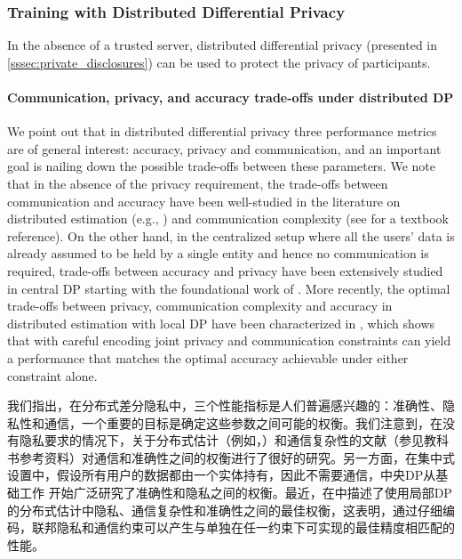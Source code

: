 \subsubsection{Training with Distributed Differential Privacy}
\label{sssec:distributed_dp}
In the absence of a trusted server, distributed differential privacy (presented in \cref{sssec:private_disclosures}) can be used to protect the privacy of participants. 

\paragraph{Communication, privacy, and accuracy trade-offs under distributed DP} 
We point out that in distributed differential privacy three performance metrics are of general interest: accuracy, privacy and communication, and an important goal is nailing down the possible trade-offs between these parameters. We note that in the absence of the privacy requirement, the trade-offs between communication and accuracy have been well-studied in the literature on distributed estimation (e.g., \cite{suresh2017distributed}) and communication complexity (see \cite{Kushilevitz_Nisan_cc} for a textbook reference). On the other hand, in the centralized setup where all the users' data is already assumed to be held by a single entity and hence no communication is required, trade-offs between accuracy and privacy have been extensively studied in central DP starting with the foundational work of \cite{DMNS06,dwork2006our}. More recently, the optimal trade-offs between privacy, communication complexity and accuracy in distributed estimation with local DP have been characterized in \cite{ChenKO2020}, which shows that with careful encoding joint privacy and communication constraints can yield a performance that matches the optimal accuracy achievable under either constraint alone.

我们指出，在分布式差分隐私中，三个性能指标是人们普遍感兴趣的：准确性、隐私性和通信，一个重要的目标是确定这些参数之间可能的权衡。我们注意到，在没有隐私要求的情况下，关于分布式估计（例如，\cite{suresh2017distributed}）和通信复杂性的文献（参见教科书参考资料\cite{Kushilevitz_Nisan_cc}）对通信和准确性之间的权衡进行了很好的研究。另一方面，在集中式设置中，假设所有用户的数据都由一个实体持有，因此不需要通信，中央DP从基础工作\cite{DMNS06,dwork2006our} 开始广泛研究了准确性和隐私之间的权衡。最近，在\cite{ChenKO2020}中描述了使用局部DP的分布式估计中隐私、通信复杂性和准确性之间的最佳权衡，这表明，通过仔细编码，联邦隐私和通信约束可以产生与单独在任一约束下可实现的最佳精度相匹配的性能。

